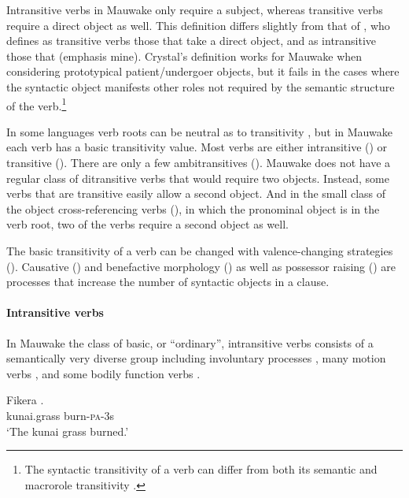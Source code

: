 Intransitive verbs in Mauwake only require a subject, whereas transitive verbs require a direct object as well. This definition differs slightly from that of \citet[397]{Crystal1997}, who defines as transitive verbs those that  take a direct object, and as intransitive those that  (emphasis mine). Crystal's definition works for Mauwake when considering prototypical patient/undergoer objects, but it fails in the cases where the syntactic object manifests other roles not required by the semantic structure of the verb.\footnote{The syntactic transitivity of a verb can differ from both its semantic and macrorole transitivity \citep{VanValinEtAl1997}.} 

In some languages verb roots can be neutral as to transitivity \citep[53]{Kittila2002}, but in Mauwake each verb has a basic transitivity value. Most verbs are either intransitive () or transitive (). There are only a few ambitransitives (). Mauwake does not have a regular class of ditransitive verbs that would require two objects. Instead, some verbs that are transitive easily allow a second object. And in the small class of the object cross-referencing verbs (), in which the pronominal object is in the verb root, two of the verbs require a second object as well. 

The basic transitivity of a verb can be changed with valence-changing strategies (). Causative () and benefactive morphology () as well as possessor raising () are processes that increase the number of syntactic objects in a clause.

\paragraph{Intransitive verbs}\label{sec:3:a:z:y:x}
{}
In Mauwake the class of basic, or ``ordinary'', intransitive verbs consists of a semantically very diverse group including involuntary processes , many motion verbs , and some bodily function verbs .

\ea%
\label{ex:3:x266}
\gll Fikera . \\
kunai.grass burn-\textsc{pa}-3s \\
\glt`The kunai grass burned.'
\z

